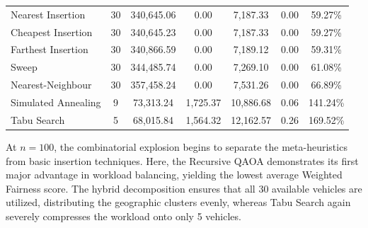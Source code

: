 \documentclass[a4paper]{report}
\begin{document}
{\begin{itemize}
\begin{itemize}
\begin{table}[H]
{\begin{tabular}{lcccccc}
Nearest Insertion & 30 & 340,645.06 & 0.00 & 7,187.33 & 0.00 & 59.27\% \\
Cheapest Insertion & 30 & 340,645.23 & 0.00 & 7,187.33 & 0.00 & 59.27\% \\
Farthest Insertion & 30 & 340,866.59 & 0.00 & 7,189.12 & 0.00 & 59.31\% \\
Sweep & 30 & 344,485.74 & 0.00 & 7,269.10 & 0.00 & 61.08\% \\
Nearest-Neighbour & 30 & 357,458.24 & 0.00 & 7,531.26 & 0.00 & 66.89\% \\
\midrule
Simulated Annealing & 9 & 73,313.24 & 1,725.37 & 10,886.68 & 0.06 & 141.24\% \\
Tabu Search & 5 & 68,015.84 & 1,564.32 & 12,162.57 & 0.26 & 169.52\% \\ 
\bottomrule
\end{tabular}
}
\end{table}

At $n=100$, the combinatorial explosion begins to separate the meta-heuristics from basic insertion techniques. Here, the Recursive QAOA demonstrates its first major advantage in workload balancing, yielding the lowest average Weighted Fairness score. The hybrid decomposition ensures that all 30 available vehicles are utilized, distributing the geographic clusters evenly, whereas Tabu Search again severely compresses the workload onto only 5 vehicles.


\end{itemize}
\end{itemize}}
\end{document}

